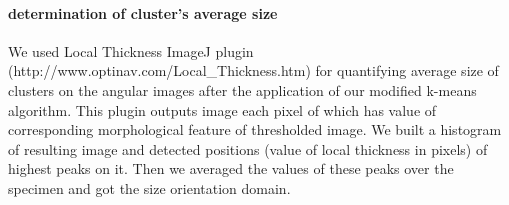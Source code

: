\paragraph{determination of cluster's average size}
We used Local Thickness ImageJ plugin (http://www.optinav.com/Local\_Thickness.htm) for quantifying average size of clusters on the angular images after the application of  our modified k-means algorithm. This plugin outputs image each pixel of which has value of corresponding morphological feature of thresholded image. We built a  histogram of resulting image and detected positions (value of local thickness in pixels) of highest peaks on it. Then we averaged the values of these peaks over the specimen and got the size orientation domain.  